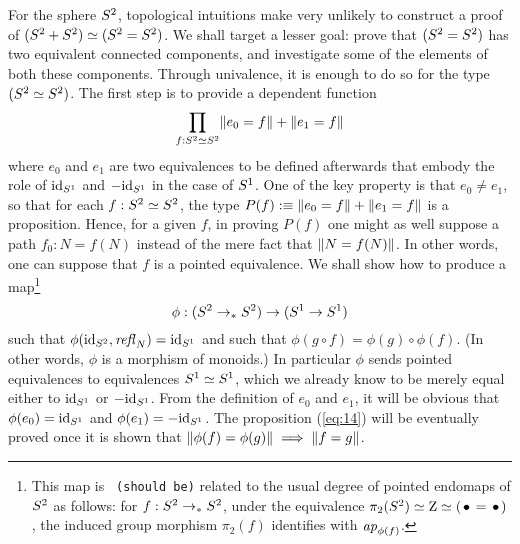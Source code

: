 \documentclass[english,a4]{article}
\begin{document}
For the sphere $S^2$, topological intuitions make very unlikely to
construct a proof of $(S^2 + S^2) \simeq (S^2 = S^2)$. We shall target a
lesser goal: prove that $(S^2 = S^2)$ has two equivalent connected
components, and investigate some of the elements of both these
components. Through univalence, it is enough to do so for the type
$(S^2 \simeq S^2)$. The first step is to provide a dependent function
\begin{equation}
  \label{eq:14}
  \prod_{f:S^2 \simeq S^2} \lVert e_0=f\rVert + \lVert e_1=f\rVert
\end{equation}
where $e_0$ and $e_1$ are two equivalences to be defined afterwards
that embody the role of $\mathord{\mathrm{id}}_{S^1}$ and $-\mathord{\mathrm{id}}_{S^1}$ in the case of
${S^1}$. One of the key property is that $e_0 \neq e_1$, so that for
each $f: S^2 \simeq S^2$, the type
$P(f) \mathrel{\hbox{:}\mkern-5mu\equiv} \lVert e_0=f\rVert + \lVert e_1=f\rVert$ is a
proposition. Hence, for a given $f$, in proving $P(f)$ one might as
well suppose a path $f_0: N = f(N)$ instead of the mere fact that
$\lVert N=f(N)\rVert$. In other words, one can suppose that $f$ is a
pointed equivalence. We shall show how to produce a map\footnote{This
  map is {\tt \color{red} (should be)} related to the usual degree of
  pointed endomaps of $S^2$ as follows: for $f:S^2 \to_\ast S^2$, under
  the equivalence $\pi_2(\Sp) \weq \zet \weq (\base = \base)$, the
  induced group morphism $\pi_2(f)$ identifies with $\mathop{{\it ap}_{\phi(f)}}$.}
\begin{equation}
  \label{eq:18}
  \phi: (S^2 \to_\ast S^2) \to ({S^1} \to {S^1})
\end{equation}
such that $\phi(\mathord{\mathrm{id}}_{S^2},\mathop{{\mathit{refl}}_{N}}) = \mathord{\mathrm{id}}_{S^1}$ and such that
$\phi(g\circ f) = \phi(g) \circ \phi(f)$. (In other words, $\phi$ is a
morphism of monoids.) In particular $\phi$ sends pointed equivalences
to equivalences ${S^1} \simeq {S^1}$, which we already know to be merely
equal either to $\mathord{\mathrm{id}}_{S^1}$ or $-\mathord{\mathrm{id}}_{S^1}$. From the definition of $e_0$
and $e_1$, it will be obvious that $\phi(e_0) = \mathord{\mathrm{id}}_{S^1}$ and
$\phi(e_1) = -\mathord{\mathrm{id}}_{S^1}$. The proposition (\ref{eq:14}) will be
eventually proved once it is shown that
$\lVert\phi(f) = \phi(g)\rVert \implies \lVert f=g\rVert$.
\end{document}
